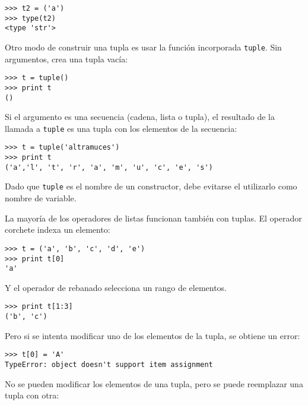 \beforeverb
\begin{verbatim}
>>> t2 = ('a')
>>> type(t2)
<type 'str'>
\end{verbatim}
\afterverb
%
Otro modo de construir una tupla es usar la función incorporada {\tt tuple}.
Sin argumentos, crea una tupla vacía:


\beforeverb
\begin{verbatim}
>>> t = tuple()
>>> print t
()
\end{verbatim}
\afterverb
%
Si el argumento es una secuencia (cadena, lista o tupla), el resultado
de la llamada a {\tt tuple} es una tupla con los elementos de la secuencia:

\beforeverb
\begin{verbatim}
>>> t = tuple('altramuces')
>>> print t
('a','l', 't', 'r', 'a', 'm', 'u', 'c', 'e', 's')
\end{verbatim}
\afterverb
%
Dado que {\tt tuple} es el nombre de un constructor, debe evitarse
el utilizarlo como nombre de variable.

La mayoría de los operadores de listas funcionan también con tuplas. El operador corchete
indexa un elemento:


\beforeverb
\begin{verbatim}
>>> t = ('a', 'b', 'c', 'd', 'e')
>>> print t[0]
'a'
\end{verbatim}
\afterverb
%
Y el operador de rebanado selecciona un rango de elementos.


\beforeverb
\begin{verbatim}
>>> print t[1:3]
('b', 'c')
\end{verbatim}
\afterverb
%
Pero si se intenta modificar uno de los elementos de la tupla, se
obtiene un error:


\beforeverb
\begin{verbatim}
>>> t[0] = 'A'
TypeError: object doesn't support item assignment
\end{verbatim}
\afterverb
%
No se pueden modificar los elementos de una tupla, pero se puede
reemplazar una tupla con otra:

